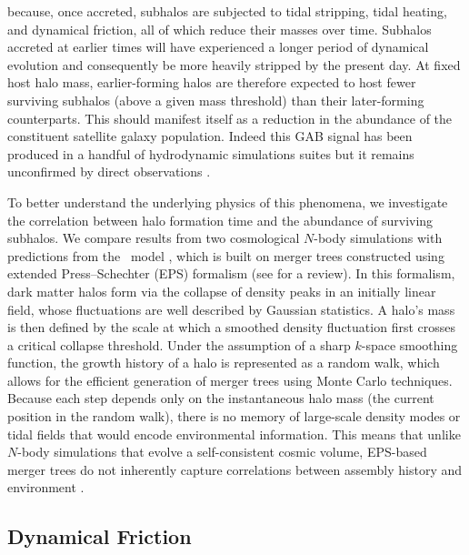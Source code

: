  because, once accreted, subhalos are subjected to tidal stripping, tidal heating, and dynamical friction, all of which reduce their masses over time. Subhalos accreted at earlier times will have experienced a longer period of dynamical evolution and consequently be more heavily stripped by the present day. At fixed host halo mass, earlier-forming halos are therefore expected to host fewer surviving subhalos (above a given mass threshold) than their later-forming counterparts. This should manifest itself as a reduction in the abundance of the constituent satellite galaxy population. Indeed this GAB signal has been produced in a handful of hydrodynamic simulations suites \citep{Artale.etal.18, Engler.etal.21b} but it remains unconfirmed by direct observations \citep{Salcedo.etal.22, Wang.etal.22}.

To better understand the underlying physics of this phenomena, we investigate the correlation between halo formation time and the abundance of surviving subhalos. We compare results from two cosmological $N$-body simulations with predictions from the \SatGen\ model \citep{Jiang.etal.21}, which is built on merger trees constructed using extended Press--Schechter (EPS) formalism (see \citealt{Zentner.07} for a review). 
 In this formalism, dark matter halos form via the collapse of density peaks in an initially linear field, whose fluctuations are well described by Gaussian statistics. A halo’s mass is then defined by the scale at which a smoothed density fluctuation first crosses a critical collapse threshold. Under the assumption of a sharp $k$-space smoothing function, the growth history of a halo is represented as a random walk, which allows for the efficient generation of merger trees using Monte Carlo techniques. Because each step depends only on the instantaneous halo mass (the current position in the random walk), there is no memory of large-scale density modes or tidal fields that would encode environmental information. This means that unlike $N$-body simulations that evolve a self-consistent cosmic volume, EPS-based merger trees do not inherently capture correlations between assembly history and environment \citep{Gao.etal.05, Zentner.07, Ma.etal.11, Zhang.etal.14}.


\subsection{Dynamical Friction}
\label{sec:DF}

